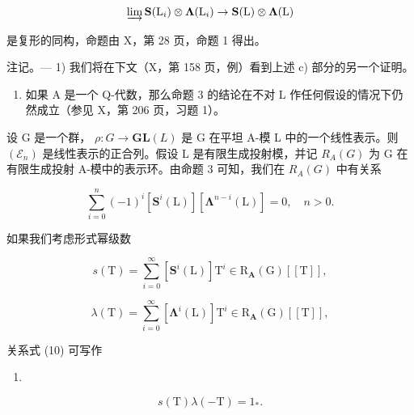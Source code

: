 \[
\varinjlim \mathbf {S} (\mathrm{L} _ {i}) \otimes \boldsymbol {\Lambda} (\mathrm{L} _ {i}) \rightarrow \mathbf {S} (\mathrm{L}) \otimes \boldsymbol {\Lambda} (\mathrm{L})
\]

是复形的同构，命题由 X，第 28 页，命题 1 得出。

注记。--- 1) 我们将在下文（X，第 158 页，例）看到上述 c) 部分的另一个证明。

\begin{enumerate}
\def\labelenumi{\arabic{enumi})}
\setcounter{enumi}{1}
\tightlist
\item
  如果 A 是一个 Q-代数，那么命题 3 的结论在不对 L 作任何假设的情况下仍然成立（参见 X，第 206 页，习题 1）。
\end{enumerate}

设 G 是一个群， \(\rho: G \to \mathbf{GL}(L)\) 是 G 在平坦 A-模 L 中的一个线性表示。则 \((\mathcal{E}_n)\) 是线性表示的正合列。假设 L 是有限生成投射模，并记 \(R_A(G)\) 为 G 在有限生成投射 A-模中的表示环。由命题 3 可知，我们在 \(R_{A}(G)\) 中有关系

\[
\sum_ {i = 0} ^ {n} (- 1) ^ {i} \left[ \mathbf {S} ^ {i} (\mathrm{L}) \right] \left[ \boldsymbol {\Lambda} ^ {n - i} (\mathrm{L}) \right] = 0, \quad n > 0.\tag{10}
\]

如果我们考虑形式幂级数

\[
s (\mathrm{T}) = \sum_ {i = 0} ^ {\infty} \left[ \mathbf {S} ^ {i} (\mathrm{L}) \right] \mathrm{T} ^ {i} \in \mathrm{R} _ {\mathbf {A}} (\mathrm{G}) [ [ \mathrm{T} ] ],
\]

\[
\lambda (\mathrm{T}) = \sum_ {i = 0} ^ {\infty} \left[ \boldsymbol {\Lambda} ^ {i} (\mathrm{L}) \right] \mathrm{T} ^ {i} \in \mathrm{R} _ {\mathbf {A}} (\mathrm{G}) [ [ \mathrm{T} ] ],
\]

关系式 (10) 可写作

\begin{enumerate}
\def\labelenumi{(\arabic{enumi})}
\setcounter{enumi}{10}
\tightlist
\item
\end{enumerate}

\[
s (\mathrm{T}) \lambda (- \mathrm{T}) = 1 _ {*}.
\]

